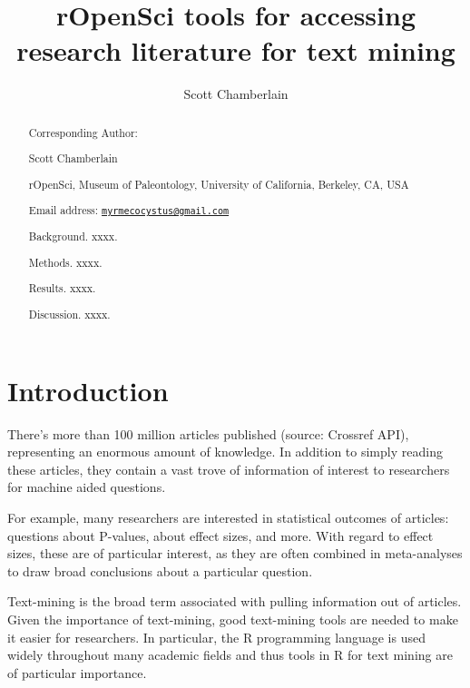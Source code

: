 \documentclass[author-year, review, 11pt]{components/elsarticle} %
\begin{document}
\begin{frontmatter}

  \title{rOpenSci tools for accessing research literature for text mining}
    \author[cstar]{Scott Chamberlain}
      \address[cstar]{rOpenSci, Museum of Paleontology, University of California, Berkeley,
CA, USA}
  
  \begin{abstract}
  Corresponding Author:
  
  Scott Chamberlain
  
  rOpenSci, Museum of Paleontology, University of California, Berkeley,
  CA, USA
  
  Email address:
  \href{mailto:myrmecocystus@gmail.com}{\nolinkurl{myrmecocystus@gmail.com}}
  
  \newpage
  
  Background. xxxx.
  
  Methods. xxxx.
  
  Results. xxxx.
  
  Discussion. xxxx.
  \end{abstract}
  
 \end{frontmatter}


\newpage

\hypertarget{introduction}{%
\section{Introduction}\label{introduction}}

There's more than 100 million articles published (source: Crossref API),
representing an enormous amount of knowledge. In addition to simply
reading these articles, they contain a vast trove of information of
interest to researchers for machine aided questions.

For example, many researchers are interested in statistical outcomes of
articles: questions about P-values, about effect sizes, and more. With
regard to effect sizes, these are of particular interest, as they are
often combined in meta-analyses to draw broad conclusions about a
particular question.

Text-mining is the broad term associated with pulling information out of
articles. Given the importance of text-mining, good text-mining tools
are needed to make it easier for researchers. In particular, the R
programming language is used widely throughout many academic fields and
thus tools in R for text mining are of particular importance.
\end{document}
